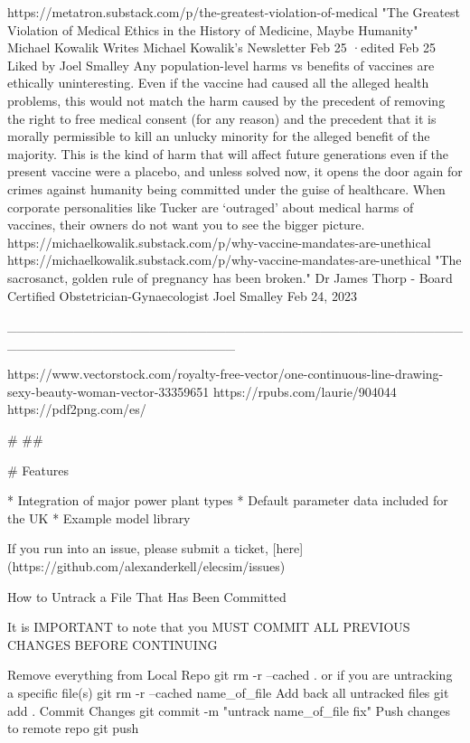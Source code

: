 https://metatron.substack.com/p/the-greatest-violation-of-medical
"The Greatest Violation of Medical Ethics in the History of Medicine, Maybe Humanity"
Michael Kowalik
Writes Michael Kowalik’s Newsletter
Feb 25
·edited Feb 25
Liked by Joel Smalley
Any population-level harms vs benefits of vaccines are ethically uninteresting. Even if the vaccine had caused all the alleged health problems, this would not match the harm caused by the precedent of removing the right to free medical consent (for any reason) and the precedent that it is morally permissible to kill an unlucky minority for the alleged benefit of the majority. This is the kind of harm that will affect future generations even if the present vaccine were a placebo, and unless solved now, it opens the door again for crimes against humanity being committed under the guise of healthcare. When corporate personalities like Tucker are ‘outraged’ about medical harms of vaccines, their owners do not want you to see the bigger picture. https://michaelkowalik.substack.com/p/why-vaccine-mandates-are-unethical
https://michaelkowalik.substack.com/p/why-vaccine-mandates-are-unethical
"The sacrosanct, golden rule of pregnancy has been broken." Dr James Thorp - Board Certified Obstetrician-Gynaecologist
Joel Smalley
Feb 24, 2023












________________________________________________________________________

https://www.vectorstock.com/royalty-free-vector/one-continuous-line-drawing-sexy-beauty-woman-vector-33359651
https://rpubs.com/laurie/904044
https://pdf2png.com/es/

#
##

# Features

* Integration of major power plant types
* Default parameter data included for the UK
* Example model library


If you run into an issue, please submit a ticket, [here](https://github.com/alexanderkell/elecsim/issues)


How to Untrack a File That Has Been Committed

It is IMPORTANT to note that you MUST COMMIT ALL PREVIOUS CHANGES BEFORE CONTINUING

    Remove everything from Local Repo git rm -r --cached . or if you are untracking a specific file(s) git rm -r --cached name_of_file
    Add back all untracked files git add .
    Commit Changes git commit -m "untrack name_of_file fix"
    Push changes to remote repo git push









